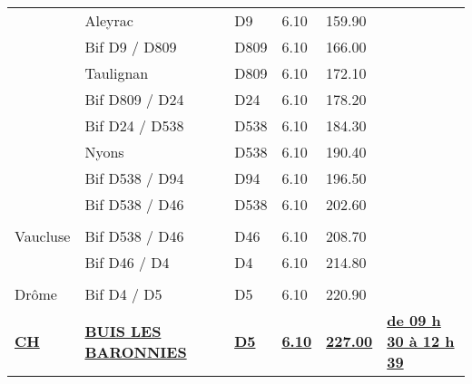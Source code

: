 \documentclass{article}%
\begin{document}
\begin{longtable}{p{2.25cm}|p{6.7cm}|p{2.0cm}|p{1.5cm}|p{1.5cm}|p{3.5cm}}
 &Aleyrac&D9&6.10&159.90& \\%
 &Bif D9 / D809&D809&6.10&166.00& \\%
 &Taulignan&D809&6.10&172.10& \\%
 &Bif D809 / D24&D24&6.10&178.20& \\%
 &Bif D24 / D538&D538&6.10&184.30& \\%
 &Nyons&D538&6.10&190.40& \\%
 &Bif D538 / D94&D94&6.10&196.50& \\%
 &Bif D538 / D46&D538&6.10&202.60& \\%
\hline& & & & & \\%
Vaucluse&Bif D538 / D46&D46&6.10&208.70& \\%
 &Bif D46 / D4&D4&6.10&214.80& \\%
\hline& & & & & \\%
Drôme&Bif D4 / D5&D5&6.10&220.90& \\%
\textbf{\underline{                               CH }}&\textbf{\underline{BUIS LES BARONNIES}}&\textbf{\underline{D5}}&\textbf{\underline{6.10}}&\textbf{\underline{227.00}}&\textbf{\underline{de 09 h 30 à 12 h 39}}\\%
\hline%
\end{longtable}%
\begin{flushleft} \textit{} \end{flushleft}%
\end{document}

